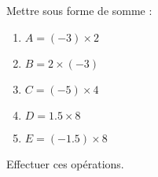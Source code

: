 
\begin{exercice}\label{exosmath-0727}

    Mettre sous forme de somme :
    \begin{enumerate}
        \item
            \( A=(-3)\times 2\)
        \item
            \( B=2\times (-3)\)
        \item
            \( C=(-5)\times 4\)
        \item
            \( D=1.5\times 8\)
        \item
            \( E=(-1.5)\times 8\)
    \end{enumerate}
    Effectuer ces opérations.

\end{exercice}
